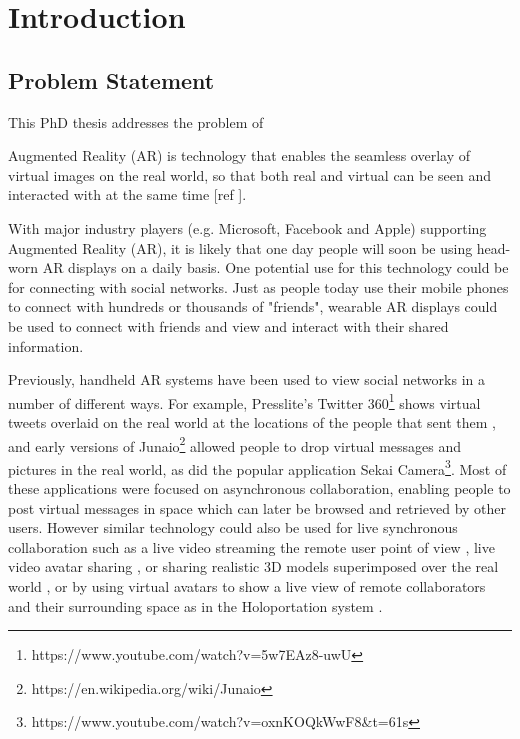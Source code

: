 \chapter{Introduction} %
\label{ch:intro} %


\section{Problem Statement}

This PhD thesis addresses the problem of 

Augmented Reality (AR) is technology that enables the seamless overlay of virtual images on the real world, so that both real and virtual can be seen and interacted with at the same time [ref ]. 



With major industry players (e.g. Microsoft, Facebook and Apple) supporting Augmented Reality (AR), 
it is likely that one day people will soon be using head-worn AR displays on a daily basis. 
One potential use for this technology could be for connecting with social networks. 
Just as people today use their mobile phones to connect with hundreds or thousands of "friends", wearable AR displays could be used to connect with friends and view and interact with their shared information.

Previously, handheld AR systems have been used to view social networks in a number of different ways. For example, Presslite's Twitter 360\footnote{https://www.youtube.com/watch?v=5w7EAz8-uwU} shows virtual tweets overlaid on the real world at the locations of the people that sent them , and early versions of Junaio\footnote{https://en.wikipedia.org/wiki/Junaio} allowed people to drop virtual messages and pictures in the real world, as did the popular application Sekai Camera\footnote{https://www.youtube.com/watch?v=oxnKOQkWwF8\&t=61s}. Most of these applications were focused on asynchronous collaboration, enabling people to post virtual messages in space which can later be browsed and retrieved by other users. However similar technology could also be used for live synchronous collaboration such as a live video streaming the remote user point of view \cite{Nassani2016}, live video avatar sharing  \cite{Billinghurst2002}, or sharing realistic 3D models superimposed over the real world \cite{Fanello2016}, or by using virtual avatars to show a live view of remote collaborators and their surrounding space as in the Holoportation system \cite{Fanello2016}.

